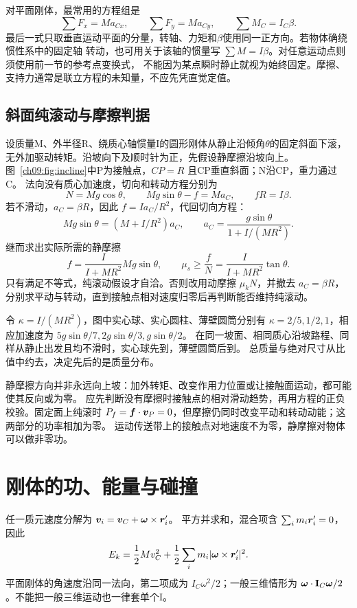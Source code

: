 {对平面刚体，最常用的方程组是
\begin{equation}
 \sum F_x=Ma_{Cx},\qquad \sum F_y=Ma_{Cy},\qquad \sum M_C=I_C\beta.
\end{equation}
最后一式只取垂直运动平面的分量，转轴、力矩和$\beta$使用同一正方向。若物体确绕惯性系中的固定轴
转动，也可用关于该轴的惯量写 $\sum M=I\beta$。对任意运动点则须使用前一节的参考点变换式，
不能因为某点瞬时静止就视为始终固定。摩擦、支持力通常是联立方程的未知量，不应先凭直觉定值。

\subsection{斜面纯滚动与摩擦判据}
设质量M、外半径R、绕质心轴惯量I的圆形刚体从静止沿倾角$\theta$的固定斜面下滚，
无外加驱动转矩。沿坡向下及顺时针为正，先假设静摩擦沿坡向上。
图~\ref{ch09:fig:incline}中P为接触点，$CP=R$ 且CP垂直斜面；N沿CP，重力通过C。
\inclineRollingDiagram
法向没有质心加速度，切向和转动方程分别为
\begin{equation}
 N=Mg\cos\theta,\qquad Mg\sin\theta-f=Ma_C,\qquad fR=I\beta.
\end{equation}
若不滑动，$a_C=\beta R$，因此 $f=Ia_C/R^2$，代回切向方程：
\begin{equation}
 Mg\sin\theta=(M+I/R^2)a_C,
 \qquad \boxed{a_C=\frac{g\sin\theta}{1+I/(MR^2)}}.
\end{equation}
继而求出实际所需的静摩擦
\begin{equation}
 f=\frac{I}{I+MR^2}Mg\sin\theta,\qquad
 \boxed{\mu_s\ge\frac fN=\frac{I}{I+MR^2}\tan\theta}.
\end{equation}
只有满足不等式，纯滚动假设才自洽。否则改用动摩擦 $\mu_kN$，并撤去 $a_C=\beta R$，
分别求平动与转动，直到接触点相对速度归零后再判断能否维持纯滚动。

令 $\kappa=I/(MR^2)$，图中实心球、实心圆柱、薄壁圆筒分别有
$\kappa=2/5,1/2,1$，相应加速度为 $5g\sin\theta/7,2g\sin\theta/3,g\sin\theta/2$。
在同一坡面、相同质心沿坡路程、同样从静止出发且均不滑时，实心球先到，薄壁圆筒后到。
总质量与绝对尺寸从比值中约去，决定先后的是质量分布。

静摩擦方向并非永远向上坡：加外转矩、改变作用力位置或让接触面运动，都可能使其反向或为零。
应先判断没有摩擦时接触点的相对滑动趋势，再用方程的正负校验。固定面上纯滚时
$P_f=\bm{f}\cdot\bm{v}_P=0$，但摩擦仍同时改变平动和转动动能；这两部分的功率相加为零。
运动传送带上的接触点对地速度不为零，静摩擦对物体可以做非零功。

\section{刚体的功、能量与碰撞}
任一质元速度分解为 $\bm{v}_i=\bm{v}_C+\bm{\omega}\times\bm{r}_i'$。
平方并求和，混合项含 $\sum_i m_i\bm{r}_i'=0$，因此
\begin{equation}
 E_k=\frac12Mv_C^2+\frac12\sum_i m_i|\bm{\omega}\times\bm{r}_i'|^2.
\end{equation}
平面刚体的角速度沿同一法向，第二项成为 $I_C\omega^2/2$；一般三维情形为
$\bm{\omega}\cdot\mathbf I_C\bm{\omega}/2$。不能把一般三维运动也一律套单个I。

}
